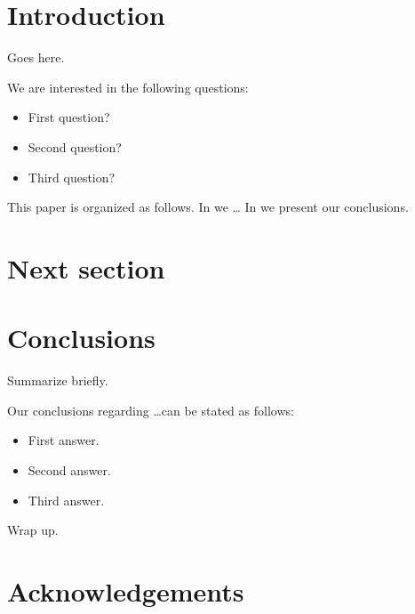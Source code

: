 \documentclass[useAMS,usenatbib]{mn2e}
\begin{document}
\section{Introduction}

Goes here.

We are interested in the following questions:

\begin{itemize}

\item First question?

\item Second question?

\item Third question?

\end{itemize}

This paper is organized as follows. In  we \ldots
In  we present our conclusions.



\section{Next section}
\label{sec:next}



\section{Conclusions}
\label{sec:conclude}

Summarize briefly.

Our conclusions regarding \ldots can be stated as follows:

\begin{itemize}

\item First answer.

\item Second answer.

\item Third answer.

\end{itemize}

Wrap up.



\section*{Acknowledgements}






\label{lastpage}
\bsp
\end{document}

